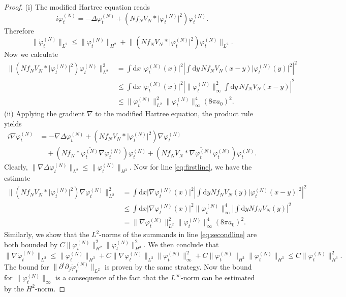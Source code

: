 \documentclass[11pt,a4paper]{scrartcl}
\newcommand{\di}{\textrm{d}}		%
\newcommand{\cc}[1]{\overline{#1}}	%
\newcommand{\norm}[1]{\lVert#1\rVert}	%
\newcommand{\ph}{\varphi_t^{(N)}}	%
\newcommand{\phdot}{\dot{\varphi}_t^{(N)}}	%
\newcommand{\bd}{\begin{displaymath}}			%
\newcommand{\ed}{\end{displaymath}}
\begin{document}
\begin{proof}(i) The modified Hartree equation reads
\bd
i \phdot = -\Delta \ph + \left(N f_N V_N \ast \lvert \ph \rvert^2 \right) \ph.
\ed
Therefore
\bd
\norm{\phdot}_{L^2} \leq \norm{\ph}_{H^2} + \norm{\left(N f_N V_N \ast \lvert \ph\rvert^2 \right)\ph}_{L^2}.
\ed
Now we calculate
\begin{align*}
\norm{\left(N f_N V_N \ast \lvert \ph\rvert^2 \right)\ph}_{L^2}^2 & = \int \di x\, \lvert \ph(x)\rvert^2 \left\lvert \int \di y\, N f_NV_N(x-y) \lvert \ph(y)\rvert^2 \right\rvert^2 \\
& \leq \int \di x\, \lvert \ph(x)\rvert^2 \left\lvert \norm{\ph}_\infty^2 \int \di y\, N f_N V_N(x-y) \right\rvert^2 \\
& \leq \norm{\ph}_{L^2}^2 \norm{\ph}_\infty^4 (8\pi a_0)^2.
\end{align*}
(ii)
Applying the gradient $\nabla$ to the modified Hartree equation, the product rule yields
\begin{align}
i \nabla \phdot & = - \nabla \Delta \ph + \left( N f_N V_N \ast \lvert \ph \rvert^2 \right) \nabla \ph \label{eq:firstline}\\
& \quad + \left( N f_N \ast \cc{\ph} \nabla \ph \right) \ph + \left( N f_N V_N \ast \cc{\nabla \ph} \ph \right) \ph. \label{eq:secondline}
\end{align}
Clearly, $\norm{\nabla \Delta \ph}_{L^2} \leq \norm{\ph}_{H^3}$. Now for line \eqref{eq:firstline}, we have the estimate
\begin{align*}
\norm{\left( N f_N V_N \ast \lvert \ph \rvert^2 \right)\nabla \ph}_{L^2}^2 & = \int \di x \lvert \nabla \ph(x)\rvert^2 \left\lvert \int \di y N f_N V_N(y) \lvert\ph(x-y) \rvert^2\right\rvert^2\\
& \leq \int \di x \lvert \nabla \ph(x)\rvert^2 \norm{\ph}_\infty^4 \left\lvert \int \di y N f_N V_N(y) \right\rvert^2 \\
& = \norm{\nabla \ph}_{L^2}^2 \norm{\ph}_\infty^4 (8 \pi a_0)^2. 
\end{align*}
Similarly, we show that the $L^2$-norms of the summands in line \eqref{eq:secondline} are both bounded by $C \norm{\ph}_{H^2}^2 \norm{\ph}_{H^3}^2$. We then conclude that
\bd
\norm{\nabla \phdot}_{L^2} \leq \norm{\ph}_{H^3} + C \norm{\nabla \ph}_{L^2} \norm{\ph}_\infty^2 + C \norm{\ph}_{H^2} \norm{\ph}_{H^3} \leq C \norm{\ph}_{H^3}^2.
\ed
The bound for $\norm{\partial^i \partial_j \phdot}_{L^2}$ is proven by the same strategy. Now the bound for $\norm{\ph}_\infty$ is a consequence of the fact that the $L^\infty$-norm can be estimated by the $H^2$-norm.


\end{proof}
\end{document}

